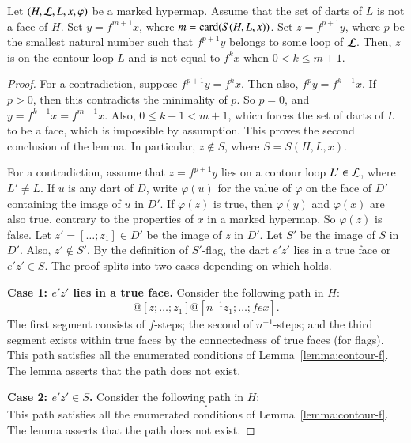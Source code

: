 \begin{lemma} \label{lemma:yz}
Let $(H,{\cal L},L,x,\varphi)$ be a marked hypermap.
Assume that the set of darts of $L$ is not a face of $H$.
Set  $y = f^{m+1} x$, where $m = {\operatorname{card}}(S(H,L,x))$.
  Set
$z=f^{p+1} y$, where $p$ be the smallest natural number 
such that $f^{p+1} y$ belongs to some loop of ${\cal L}$.
Then, $z$ is on the contour loop $L$ and is not
equal to $f^k x$ when $0 < k \le {m+1}$.
\end{lemma}

\begin{proof} 
  For a contradiction, suppose $f^{p+1} y = f^k x$. Then also, $f^p y
  = f^{k-1} x$.  If $p>0$, then this contradicts the minimality of
  $p$.  So $p=0$, and $y=f^{k-1} x = f^{m+1} x$.  Also, $0\le k-1 <
  {m+1}$, which forces the set of darts of $L$ to be a face, which is
  impossible by assumption.  This proves the second conclusion of the
  lemma.  In particular, $z\not\in S$, where $S = S(H,L,x)$.

For a contradiction, assume that $z = f^{p+1} y$ lies on a
contour loop $L'\in {\cal L}$, where $L'\ne L$.  
If $u$ is any dart of $D$, write $\varphi(u)$ for the value
of $\varphi$ on the face of $D'$ containing the image of $u$ in $D'$.
If $\varphi(z)$ is true, then $\varphi(y)$
and $\varphi(x)$ are also true, contrary to the properties of $x$
in a marked hypermap.
So $\varphi(z)$ is false.  Let $z' = [\ldots;z_1]\in D'$ be the
image of $z$ in $D'$.  Let $S'$ be the image of $S$ in $D'$.
Also, $z'\not\in S'$.  By the definition of
$S'$-flag, the dart $e'z'$ lies in a true face or $e'z'\in S$.  The
proof splits into two cases depending on which holds.

{\bf Case 1: $e'z'$ lies in a true face.}  Consider the following
path in $H$:
\begin{displaymath}
[y;fy;\ldots;z] @ [z;\ldots;z_1] @ [n^{-1} z_1;\ldots;f e x].
\end{displaymath}
The first segment consists of $f$-steps; the second of $n^{-1}$-steps;
and the third segment exists within true faces by the connectedness of
true faces (for flags).  This path satisfies all the enumerated
conditions of Lemma~\ref{lemma:contour-f}.  The lemma asserts that the
path does not exist.

{\bf Case 2: $e'z'\in S$.}   Consider the following path in $H$:
\begin{displaymath}
[y;f y;\ldots;z].
\end{displaymath}
This path satisfies all the enumerated conditions of
Lemma~\ref{lemma:contour-f}.  The lemma asserts that the path does not
exist.
\end{proof}


